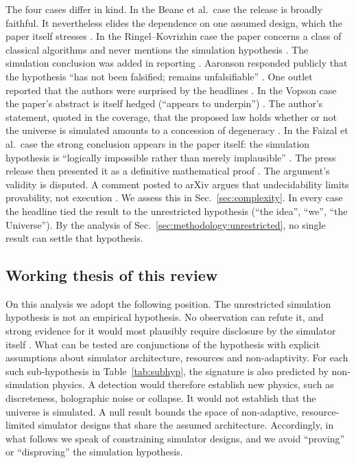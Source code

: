 The four cases differ in kind. In the Beane et al.\ case the release is
broadly faithful. It nevertheless elides the dependence on one assumed design,
which the paper itself stresses \cite{Beane2014constraints,UW2012do}. In the
Ringel--Kovrizhin case the paper concerns a class of classical algorithms and
never mentions the simulation hypothesis \cite{Ringel2017quantized}. The
simulation conclusion was added in reporting \cite{Eck2017physicists}.
Aaronson responded publicly that the hypothesis ``has not been falsified;
remains unfalsifiable'' \cite{Aaronson2017because}. One outlet reported that
the authors were surprised by the headlines \cite{Galeon2017fact}. In the
Vopson case the paper's abstract is itself hedged (``appears to underpin'')
\cite{Vopson2023second}. The author's statement, quoted in the coverage, that
the proposed law holds whether or not the universe is simulated amounts to a
concession of degeneracy \cite{Ferreira2023mind}. In the Faizal et al.\ case
the strong conclusion appears in the paper itself: the simulation hypothesis
is ``logically impossible rather than merely implausible''
\cite{Faizal2025consequences}. The press release then presented it as a
definitive mathematical proof \cite{UBCO2025ubco}. The argument's validity is
disputed. A comment posted to arXiv argues that undecidability limits
provability, not execution \cite{Redden2025provability}. We assess this in
Sec.~\ref{sec:complexity}. In every case the headline tied the result to
the unrestricted hypothesis (``the idea'', ``we'', ``the Universe''). By the
analysis of Sec.~\ref{sec:methodology:unrestricted}, no single result can
settle that hypothesis.

\subsection{Working thesis of this review}
\label{sec:methodology:thesis}

On this analysis we adopt the following position. The unrestricted
simulation hypothesis is not an empirical hypothesis. No observation can refute
it, and strong evidence for it would most plausibly require disclosure by the
simulator itself \cite{Chalmers2022can}.
What can be tested are conjunctions of the hypothesis with explicit assumptions
about simulator architecture, resources and non-adaptivity. For each such
sub-hypothesis in Table~\ref{tab:subhyp}, the signature is also predicted by
non-simulation physics. A detection would therefore establish new physics,
such as discreteness, holographic noise or collapse. It would not establish
that the universe is simulated. A null result bounds the space of
non-adaptive, resource-limited simulator designs that share the assumed
architecture. Accordingly, in what follows we speak of constraining simulator
designs, and we avoid ``proving'' or ``disproving'' the simulation hypothesis.

